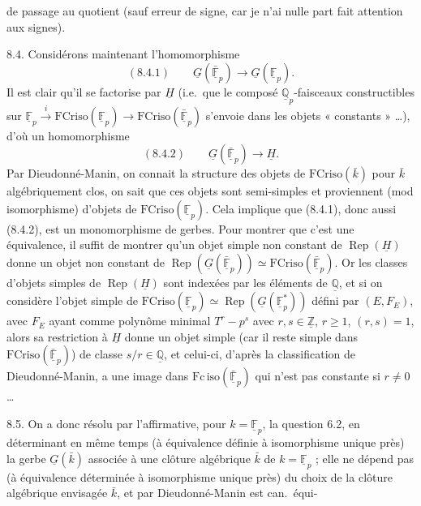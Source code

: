 \documentclass[11pt,a4paper]{article}
\begin{document}
de passage au quotient (sauf erreur de signe, car je n'ai nulle part fait
attention aux signes).

8.4. \quad Considérons maintenant l'homomorphisme
\[
(8.4.1) \qquad \underline{G}(\bar{\underline{\mathbb{F}}}_{p})
\longrightarrow \underline{G}(\underline{\mathbb{F}}_{p}) .
\]
Il est clair qu'il se factorise par $\underline{H}$ (i.e.\ que le composé
$\underline{\mathbb{Q}}_{p}$-faisceaux constructibles sur
$\underline{\mathbb{F}}_{p} \xrightarrow{\ i\ }
\mathrm{FCriso}(\underline{\mathbb{F}}_{p}) \longrightarrow
\mathrm{FCriso}(\bar{\underline{\mathbb{F}}}_{p})$ s'envoie dans les objets
« constants » …), d'où un homomorphisme
\[
(8.4.2) \qquad \underline{G}(\bar{\underline{\mathbb{F}}}_{p})
\longrightarrow \underline{H} .
\]
Par Dieudonné-Manin, on connait la structure des objets de
$\mathrm{FCriso}(\bar{k})$ pour $\bar{k}$ algébriquement clos, on sait que
ces objets sont semi-simples et proviennent (mod isomorphisme) d'objets de
$\mathrm{FCriso}(\underline{\mathbb{F}}_{p})$. Cela implique que (8.4.1),
donc aussi (8.4.2), est un monomorphisme de gerbes. Pour montrer que c'est
une équivalence, il suffit de montrer qu'un objet simple non constant de
\struck{\ill{}} $\operatorname{Rep}(\underline{H})$ donne un objet non
constant de $\operatorname{Rep}(\underline{G}(\bar{\underline{\mathbb{F}}}_{p}))
\simeq \mathrm{FCriso}(\bar{\underline{\mathbb{F}}}_{p})$. Or les classes
d'objets simples de $\operatorname{Rep}(\underline{H})$ sont indexées par les
éléments de $\underline{\mathbb{Q}}$, et si on considère l'objet simple de
$\mathrm{FCriso}(\underline{\mathbb{F}}_{p}) \simeq
\operatorname{Rep}(\underline{G}(\underline{\mathbb{F}}^{*}_{p}))$ défini par
$(E, F_{E})$, avec $F_{E}$ ayant comme polynôme minimal $T^{r} - p^{s}$ avec
$r, s \in \underline{\mathbb{Z}}$, $r \geq 1$, $(r,s) = 1$, alors sa
restriction à $\underline{H}$ donne un objet simple \struck{\ill{}} (car il
reste simple dans $\mathrm{FCriso}(\bar{\underline{\mathbb{F}}}_{p})$) de
classe $s/r \in \underline{\mathbb{Q}}$, et celui-ci, d'après la
classification de Dieudonné-Manin, \struck{\ill{}} a une image dans
$\mathrm{Fc\,iso}(\bar{\underline{\mathbb{F}}}_{p})$ qui n'est pas constante
si $r \neq 0$ …

8.5. \quad On a donc  résolu par l'affirmative, pour
$k = \underline{\mathbb{F}}_{p}$, la question 6.2, en déterminant en même
temps (à équivalence définie à isomorphisme unique près) la gerbe
$\underline{G}(\bar{k})$ associée à une clôture algébrique $\bar{k}$ de
$k = \underline{\mathbb{F}}_{p}$ ; \struck{\ill{}} elle ne dépend pas (à
\struck{\ill{}} équivalence déterminée à isomorphisme unique près) du choix
de la clôture algébrique envisagée $\bar{k}$, et par Dieudonné-Manin est
can.\ équi-
\end{document}

